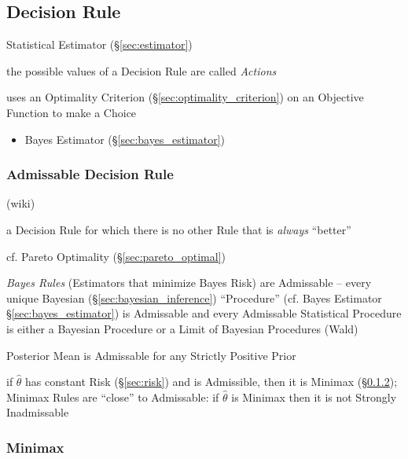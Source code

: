 \subsection{Decision Rule}\label{sec:decision_rule}

Statistical Estimator (\S\ref{sec:estimator})

the possible values of a Decision Rule are called \emph{Actions}

uses an Optimality Criterion (\S\ref{sec:optimality_criterion}) on an Objective
Function to make a Choice

\begin{itemize}
  \item Bayes Estimator (\S\ref{sec:bayes_estimator})
\end{itemize}



\subsubsection{Admissable Decision Rule}\label{sec:admissable_decision_rule}

(wiki)

a Decision Rule for which there is no other Rule that is \emph{always}
``better''

cf. Pareto Optimality (\S\ref{sec:pareto_optimal})

\emph{Bayes Rules} (Estimators that minimize Bayes Risk) are Admissable -- every
unique Bayesian (\S\ref{sec:bayesian_inference}) ``Procedure'' (cf. Bayes
Estimator \S\ref{sec:bayes_estimator}) is Admissable and every Admissable
Statistical Procedure is either a Bayesian Procedure or a Limit of Bayesian
Procedures (Wald)

Posterior Mean is Admissable for any Strictly Positive Prior

if $\hat{\theta}$ has constant Risk (\S\ref{sec:risk}) and is Admissible, then
it is Minimax (\S\ref{sec:minimax});
Minimax Rules are ``close'' to Admissable: if $\hat{\theta}$ is Minimax then it
is not Strongly Inadmissable



\subsubsection{Minimax}\label{sec:minimax}

